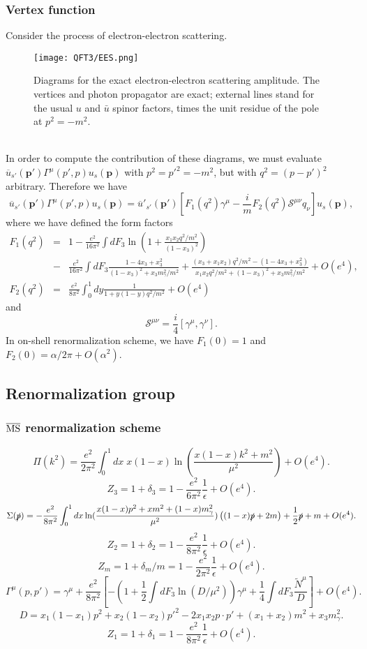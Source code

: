 \subsubsection{Vertex function}
Consider the process of electron-electron scattering.
\begin{figure}[!h]
\centering
\texttt{[image: QFT3/EES.png]}
\caption{Diagrams for the exact electron-electron scattering amplitude. The vertices and photon propagator are exact; external lines stand for the usual $u$ and $\bar{u}$ spinor factors, times the unit residue of the pole at $p^2=-m^2$.}
\end{figure}
\\
In order to compute the contribution of these diagrams, we must evaluate $\overline{u}_{s'}(\bm{p}')\Gamma^{\mu}(p',p)u_s(\bm{p})$ with $p^2 = p'^2 = -m^2$, but with $q^2 = (p-p')^2$ arbitrary. Therefore we have 
\[\overline{u}_{s'}(\bm{p}')\Gamma^{\mu}(p',p)u_s(\bm{p}) = \overline{u}'_{s'}(\bm{p}')\left[F_1(q^2)\gamma^{\mu} - \frac{i}{m}F_2(q^2)\mathcal{S}^{\mu\nu}q_{\nu}\right]u_s(\bm{p}),\]
where we have defined the form factors
\begin{eqnarray}
F_1(q^2) &=& 1 - \frac{e^2}{16\pi^2} \int dF_3  \ln \left ( 1 + \frac{x_1x_2q^2/m^2}{(1-x_3)^2}\right ) \nonumber \\
&-& \frac{e^2}{16\pi^2} \int dF_3 \frac{1-4x_3+x_3^2}{(1-x_3)^2+x_3m_{\gamma}^2/m^2} + \frac{(x_3+x_1x_2)q^2/m^2-(1-4x_3+x_3^2)}{x_1x_2q^2/m^2+(1-x_3)^2+x_3m_{\gamma}^2/m^2} + O(e^4) ,\nonumber \\
F_2(q^2) &=& \frac{e^2}{8\pi^2} \int_0^1 dy \frac{1}{1 + y(1-y)q^2/m^2} + O(e^4) \nonumber
\end{eqnarray}
and
\[\mathcal{S}^{\mu\nu}= \frac{i}{4}[\gamma^{\mu},\gamma^{\nu}].\]
In on-shell renormalization scheme, we have $F_1(0) = 1$ and $F_2(0) = {\alpha}/{2\pi} + O(\alpha^2)$.

\subsection{Renormalization group}
\subsubsection{$\overline{\rm MS}$ renormalization scheme}
\[\Pi(k^2) = \frac{e^2}{2\pi^2} \int_0^1 dx \; x(1-x) \ln(\frac{x(1-x)k^2+m^2}{\mu^2}) + O(e^4).\]
\[Z_3 = 1 + \delta_3 = 1-\frac{e^2}{6\pi^2} \frac{1}{\epsilon} + O(e^4).\]
\[\Sigma(\slashed{p}) = -\frac{e^2}{8\pi^2} \int_0^1 dx  \ln(\frac{x(1-x)p^2 + xm^2 + (1-x)m_{\gamma}^2}{\mu^2}) \left((1-x)\slashed{p}+2m\right) + \frac{1}{2}\slashed{p} + m + O(e^4) .\]
\[Z_2 = 1 + \delta_2 =  1 - \frac{e^2}{8\pi^2}  \frac{1}{\epsilon} + O(e^4).\]
\[Z_m = 1 + \delta_m/m = 1 - \frac{e^2}{2\pi^2} \frac{1}{\epsilon} + O(e^4) .\]
\[\Gamma^{\mu}(p,p') = \gamma^{\mu} + \frac{e^2}{8\pi^2} \left[-\left(  1 + \frac{1}{2} \int dF_3 \ln (D/\mu^2)\right)\gamma^{\mu} + \frac{1}{4} \int dF_3 \frac{\tilde{N}^{\mu}}{D}\right] + O(e^4).\]
\[D = x_1(1-x_1)p^2 + x_2(1-x_2)p'^2 - 2x_1x_2p \cdot p' + (x_1+x_2)m^2 + x_3 m_{\gamma}^2.\]
\[Z_1 =1 + \delta_1 = 1 -  \frac{e^2}{8\pi^2}\frac{1}{\epsilon} + O(e^4).\]

